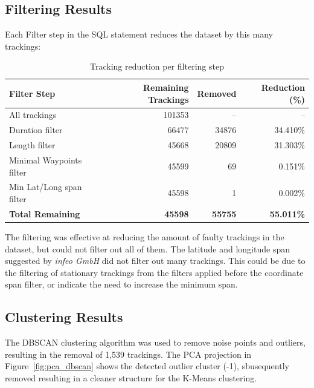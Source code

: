 \documentclass[a4paper,12pt,twoside]{scrreprt}
\begin{document}
\subsection{Filtering Results}
Each Filter step in the SQL statement reduces the dataset by this many
trackings:
\begin{table}[ht]
  \centering
  \begin{tabular}{|l|r|r|r|}
    \hline
    \textbf{Filter Step}     & \textbf{Remaining Trackings} &
    \textbf{Removed}
                             &
    \textbf{Reduction (\%)}
    \\
    \hline
    All trackings            & 101353                       & --
                             & --
    \\
    Duration filter          & 66477                        &
    34876
                             &
    34.410\%
    \\
    Length filter            & 45668                        &
    20809
                             &
    31.303\%
    \\
    Minimal Waypoints filter & 45599                        &
    69
                             &
    0.151\%
    \\
    Min Lat/Long span filter & 45598                        &
    1
                             &
    0.002\%
    \\
    \hline
    \textbf{Total Remaining} & \textbf{45598}               &
    \textbf{55755}
                             &
    \textbf{55.011\%}
    \\
    \hline
  \end{tabular}
  \caption{Tracking reduction per filtering step}
  \label{tab:filtering_summary}
\end{table}
\FloatBarrier

The filtering was effective at reducing the amount of faulty trackings in the
dataset, but could not filter out all of them.
The latitude and longitude span suggested by \textit{infeo GmbH} did not filter
out many trackings. This could be due to the filtering of stationary trackings
from the filters applied before the coordinate span filter, or indicate the
need to increase the minimum span.

\subsection{Clustering Results}

The DBSCAN clustering algorithm was used to remove noise points and outliers,
resulting in the removal of 1,539 trackings.
The PCA projection in Figure~\ref{fig:pca_dbscan} shows the detected outlier
cluster (-1), sbusequently removed resulting in a cleaner structure for the
K-Means clustering.
\end{document}
